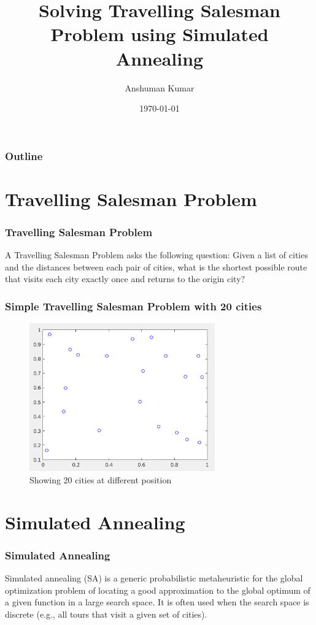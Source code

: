 \documentclass{beamer}
\title[Simulated Annealing]{Solving Travelling Salesman Problem using Simulated Annealing}
\author[Anshuman]{Anshuman Kumar}
\institute[IIT Bombay]{
    Department of Aerospace Engineering \\
    IIT Bombay
}
\date{\today}
\begin{document}
\begin{frame}
    \titlepage
\end{frame}


\begin{frame}
    \frametitle{Outline}
    \tableofcontents
\end{frame}

\section{Travelling Salesman Problem}
\begin{frame}
    \frametitle{Travelling Salesman Problem}
    \begin{definition}
        A \alert{Travelling Salesman Problem} asks the following
        question: Given a list of cities and the distances between each
        pair of cities, what is the shortest possible route that visits
        each city exactly once and returns to the origin city?
    \end{definition}
\end{frame}

\begin{frame}
    \frametitle{Simple Travelling Salesman Problem with 20 cities}
    \begin{figure}[t]
        \includegraphics[width = 8cm]{20cities}
        \caption{Showing 20 cities at different position}
        \centering
    \end{figure}
\end{frame}

\section{Simulated Annealing}

\begin{frame}
    \frametitle{Simulated Annealing}
    \begin{definition}
        Simulated annealing (SA) is a generic probabilistic metaheuristic
        for the global optimization problem of locating a good 
        approximation to the global optimum of a given function in a
        large search space. It is often used when the search space is
        discrete (e.g., all tours that visit a given set of cities).
    \end{definition}
\end{frame}
\end{document}
